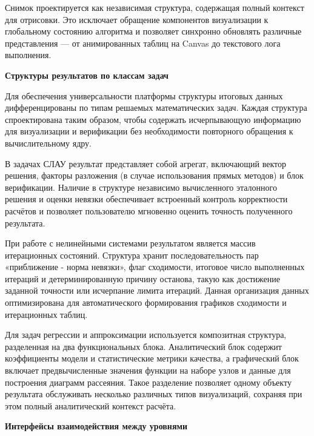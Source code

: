 \documentclass[12pt, oneside]{book}
\begin{document}
    \quad Снимок проектируется как независимая структура, содержащая полный контекст для отрисовки. Это исключает обращение компонентов визуализации к глобальному состоянию алгоритма и позволяет синхронно обновлять различные представления — от анимированных таблиц на Canvas до текстового лога выполнения.

    \vspace{0.5em}

    \textbf{\large Структуры результатов по классам задач}

    \vspace{0.5em}

    \quad Для обеспечения универсальности платформы структуры итоговых данных дифференцированы по типам решаемых математических задач. Каждая структура спроектирована таким образом, чтобы содержать исчерпывающую информацию для визуализации и верификации без необходимости повторного обращения к вычислительному ядру.

    \quad В задачах СЛАУ результат представляет собой агрегат, включающий вектор решения, факторы разложения (в случае использования прямых методов) и блок верификации. Наличие в структуре независимо вычисленного эталонного решения и оценки невязки обеспечивает встроенный контроль корректности расчётов и позволяет пользователю мгновенно оценить точность полученного результата.

    \quad При работе с нелинейными системами результатом является массив итерационных состояний. Структура хранит последовательность пар «приближение - норма невязки», флаг сходимости, итоговое число выполненных итераций и детерминированную причину останова, такую как достижение заданной точности или исчерпание лимита итераций. Данная организация данных оптимизирована для автоматического формирования графиков сходимости и итерационных таблиц.

    \quad Для задач регрессии и аппроксимации используется композитная структура, разделенная на два функциональных блока. Аналитический блок содержит коэффициенты модели и статистические метрики качества, а графический блок включает предвычисленные значения функции на наборе узлов и данные для построения диаграмм рассеяния. Такое разделение позволяет одному объекту результата обслуживать несколько различных типов визуализаций, сохраняя при этом полный аналитический контекст расчёта.

    \vspace{0.5em}

    \textbf{\large Интерфейсы взаимодействия между уровнями}
\end{document}
